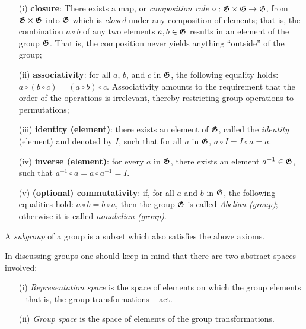 \begin{itemize}
\item[(i)] {\bf closure}:
There exists a map, or {\em composition rule}  $\circ : {\frak G} \times {\frak G} \rightarrow {\frak G}$, from  ${\frak G} \times {\frak G}$ into ${\frak G}$
which is {\em closed} under any composition
of elements; that is, the combination $a\circ b$ of any two elements
$a,b \in {\frak G}$ results in an element of the group ${\frak G}$.
That is,
the composition never yields anything ``outside'' of the group;
\item[(ii)]
{\bf associativity}:
for all $a$, $b$, and $c$ in ${\frak G}$,
the following equality holds: $a \circ (b \circ c) = (a \circ b) \circ c$.
Associativity amounts to the requirement that the order of the operations is irrelevant,
thereby restricting group operations to permutations;
\item[(iii)]
{\bf identity (element)}:
there exists an element of ${\frak G}$,
called the  {\em identity} (element) and denoted by $I$, such that for all $a$ in ${\frak G}$,
$a \circ I = I \circ  a=  a$.
\item[(iv)]
{\bf inverse (element)}:
for every $a$ in ${\frak G}$, there exists an element $a^{-1} \in {\frak G}$, such that $a^{-1} \circ  a  = a \circ  a^{-1}   =I$.
\item[(v)]
{\bf (optional) commutativity}:
if, for all $a$ and $b$ in ${\frak G}$, the following equalities hold: $a \circ b = b \circ a$,
then the group ${\frak G}$ is called {\em Abelian (group)}; otherwise it is called {\em nonabelian (group)}.
\end{itemize}


A {\em subgroup} of a group is a subset which also satisfies the above axioms.

In discussing groups one should keep in mind that there are two abstract spaces involved:

\begin{itemize}
\item[(i)] {\em Representation space} is the space of elements on which the group elements -- that is, the group transformations -- act.


\item[(ii)]  {\em Group space} is the space of elements of the group transformations.
\end{itemize}

